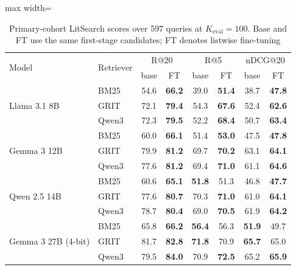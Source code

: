 \documentclass[pdflatex,sn-basic,Numbered]{sn-jnl}%
\theoremstyle{thmstyleone}%
\theoremstyle{thmstyletwo}%
\theoremstyle{thmstylethree}%
\begin{document}
\begin{table}[ht]


\centering
\renewcommand{\arraystretch}{1.1}
\setlength{\tabcolsep}{3.5pt}
\footnotesize
\begin{adjustbox}{max width=\linewidth}
\begin{tabular}{l l c c c c c c}
\hline
\multirow{2}{*}{Model} & \multirow{2}{*}{Retriever}
 & \multicolumn{2}{c}{R@20} & \multicolumn{2}{c}{R@5}
 & \multicolumn{2}{c}{nDCG@20} \\
 & & base & FT & base & FT & base & FT \\
\hline
\multirow{3}{*}{Llama 3.1 8B}
 & BM25  & 54.6 & \textbf{66.2} & 39.0 & \textbf{51.4} & 38.7 & \textbf{47.8} \\
 & GRIT  & 72.1 & \textbf{79.4} & 54.3 & \textbf{67.6} & 52.4 & \textbf{62.6} \\
 & Qwen3 & 72.3 & \textbf{79.5} & 52.2 & \textbf{68.4} & 50.7 & \textbf{63.4} \\
\hline
\multirow{3}{*}{Gemma 3 12B}
 & BM25  & 60.0 & \textbf{66.1} & 51.4 & \textbf{53.0} & 47.5 & \textbf{47.8} \\
 & GRIT  & 79.9 & \textbf{81.2} & 69.7 & \textbf{70.2} & 63.1 & \textbf{64.1} \\
 & Qwen3 & 77.6 & \textbf{81.2} & 69.4 & \textbf{71.0} & 61.1 & \textbf{64.6} \\
\hline
\multirow{3}{*}{Qwen 2.5 14B}
 & BM25  & 60.6 & \textbf{65.1} & \textbf{51.8} & 51.3 & 46.8 & \textbf{47.7} \\
 & GRIT  & 77.6 & \textbf{80.7} & 70.3 & \textbf{71.0} & 61.0 & \textbf{64.1} \\
 & Qwen3 & 78.7 & \textbf{80.4} & 69.0 & \textbf{70.5} & 61.9 & \textbf{64.2} \\
\hline
\multirow{3}{*}{Gemma 3 27B (4-bit)}
 & BM25  & 65.8 & \textbf{66.2} & \textbf{56.4} & 56.3 & \textbf{51.9} & 49.7 \\
 & GRIT  & 81.7 & \textbf{82.8} & \textbf{71.8} & 70.9 & \textbf{65.7} & 65.0 \\
 & Qwen3 & 79.5 & \textbf{84.0} & 70.9 & \textbf{72.5} & 65.2 & \textbf{65.9} \\
\hline
\end{tabular}
\end{adjustbox}


\caption{Primary-cohort LitSearch scores over 597 queries at $K_{\mathrm{eval}}=100$. Base and FT use the same first-stage candidates; FT denotes listwise fine-tuning}
\label{tab:litsearch-main}
\end{table}
\end{document}
